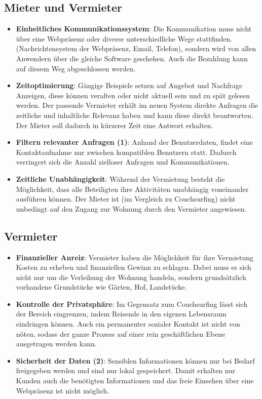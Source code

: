 \subsection{Mieter und Vermieter}
\begin{itemize}
   \item
   \textbf{Einheitliches Kommunikationssystem}: Die Kommunikation muss nicht über eine Webpräsenz oder diverse unterschiedliche Wege stattfinden. (Nachrichtensystem der Webpräsenz, Email, Telefon), sondern wird von allen Anwendern über die gleiche Software geschehen. Auch die Bezahlung kann auf diesem Weg abgeschlossen werden.

   \item 
   \textbf{Zeitoptimierung}: Gängige Beispiele setzen auf Angebot und Nachfrage Anzeigen, diese können veralten oder nicht aktuell sein und zu spät gelesen werden. Der passende Vermieter erhält im neuen System direkte Anfragen die zeitliche und inhaltliche Relevanz haben und kann diese direkt beantworten. Der Mieter soll dadurch in kürzerer Zeit eine Antwort erhalten.

   \item
   \textbf{Filtern relevanter Anfragen (1)}: Anhand der Benutzerdaten, findet eine Kontaktaufnahme nur zwischen kompatiblen Benutzern statt. Dadurch verringert sich die Anzahl zielloser Anfragen und Kommunikationen.

   \item 
   \textbf{Zeitliche Unabhängigkeit}: Während der Vermietung besteht die Möglichkeit, dass alle Beteiligten ihre Aktivitäten unabhängig voneinander ausführen können. Der Mieter ist (im Vergleich zu Couchsurfing) nicht unbedingt auf den Zugang zur Wohnung durch den Vermieter angewiesen. 

\end{itemize}


\subsection{Vermieter}
\begin{itemize}
   \item 
   \textbf{Finanzieller Anreiz}: Vermieter haben die Möglichkeit für ihre Vermietung Kosten zu erheben und finanziellen Gewinn zu schlagen.
   Dabei muss es sich nicht nur um die Verleihung der Wohnung handeln, sondern grundsätzlich vorhandene Grundstücke wie Gärten, Hof, Landstücke.

   \item 
   \textbf{Kontrolle der Privatsphäre}: Im Gegensatz zum Couchsurfing lässt sich der Bereich eingrenzen, indem Reisende in den eigenen Lebensraum eindringen können. Auch ein permanenter sozialer Kontakt ist nicht von nöten, sodass der ganze Prozess auf einer rein geschäftlichen Ebene ausgetragen werden kann.

   \item 
   \textbf{Sicherheit der Daten (2)}: Sensiblen Informationen können nur bei Bedarf freigegeben werden und sind nur lokal gespeichert. Damit erhalten nur Kunden auch die benötigten Informationen und das freie Einsehen über eine Webpräsenz ist nicht möglich.

\end{itemize}
   


